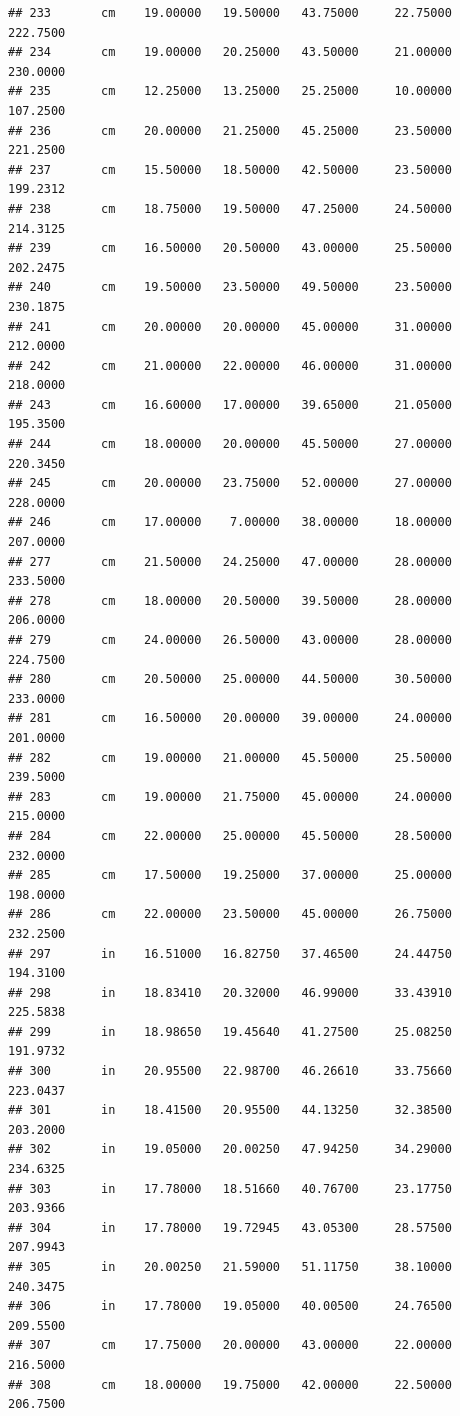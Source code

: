\documentclass[]{article}
\begin{document}
\begin{verbatim}
## 233       cm    19.00000   19.50000   43.75000     22.75000  222.7500
## 234       cm    19.00000   20.25000   43.50000     21.00000  230.0000
## 235       cm    12.25000   13.25000   25.25000     10.00000  107.2500
## 236       cm    20.00000   21.25000   45.25000     23.50000  221.2500
## 237       cm    15.50000   18.50000   42.50000     23.50000  199.2312
## 238       cm    18.75000   19.50000   47.25000     24.50000  214.3125
## 239       cm    16.50000   20.50000   43.00000     25.50000  202.2475
## 240       cm    19.50000   23.50000   49.50000     23.50000  230.1875
## 241       cm    20.00000   20.00000   45.00000     31.00000  212.0000
## 242       cm    21.00000   22.00000   46.00000     31.00000  218.0000
## 243       cm    16.60000   17.00000   39.65000     21.05000  195.3500
## 244       cm    18.00000   20.00000   45.50000     27.00000  220.3450
## 245       cm    20.00000   23.75000   52.00000     27.00000  228.0000
## 246       cm    17.00000    7.00000   38.00000     18.00000  207.0000
## 277       cm    21.50000   24.25000   47.00000     28.00000  233.5000
## 278       cm    18.00000   20.50000   39.50000     28.00000  206.0000
## 279       cm    24.00000   26.50000   43.00000     28.00000  224.7500
## 280       cm    20.50000   25.00000   44.50000     30.50000  233.0000
## 281       cm    16.50000   20.00000   39.00000     24.00000  201.0000
## 282       cm    19.00000   21.00000   45.50000     25.50000  239.5000
## 283       cm    19.00000   21.75000   45.00000     24.00000  215.0000
## 284       cm    22.00000   25.00000   45.50000     28.50000  232.0000
## 285       cm    17.50000   19.25000   37.00000     25.00000  198.0000
## 286       cm    22.00000   23.50000   45.00000     26.75000  232.2500
## 297       in    16.51000   16.82750   37.46500     24.44750  194.3100
## 298       in    18.83410   20.32000   46.99000     33.43910  225.5838
## 299       in    18.98650   19.45640   41.27500     25.08250  191.9732
## 300       in    20.95500   22.98700   46.26610     33.75660  223.0437
## 301       in    18.41500   20.95500   44.13250     32.38500  203.2000
## 302       in    19.05000   20.00250   47.94250     34.29000  234.6325
## 303       in    17.78000   18.51660   40.76700     23.17750  203.9366
## 304       in    17.78000   19.72945   43.05300     28.57500  207.9943
## 305       in    20.00250   21.59000   51.11750     38.10000  240.3475
## 306       in    17.78000   19.05000   40.00500     24.76500  209.5500
## 307       cm    17.75000   20.00000   43.00000     22.00000  216.5000
## 308       cm    18.00000   19.75000   42.00000     22.50000  206.7500

\end{verbatim}
\end{document}
